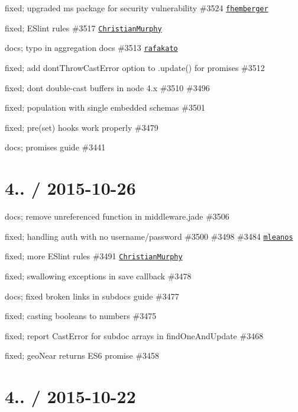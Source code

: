 \begin{DoxyItemize}
\item fixed; upgraded {\ttfamily ms} package for security vulnerability \#3524 \href{https://github.com/fhemberger}{\tt fhemberger}
\item fixed; E\+Slint rules \#3517 \href{https://github.com/ChristianMurphy}{\tt Christian\+Murphy}
\item docs; typo in aggregation docs \#3513 \href{https://github.com/rafakato}{\tt rafakato}
\item fixed; add {\ttfamily dont\+Throw\+Cast\+Error} option to .update() for promises \#3512
\item fixed; don\textquotesingle{}t double-\/cast buffers in node 4.\+x \#3510 \#3496
\item fixed; population with single embedded schemas \#3501
\item fixed; pre(\textquotesingle{}set\textquotesingle{}) hooks work properly \#3479
\item docs; promises guide \#3441
\end{DoxyItemize}

\section*{4.. / 2015-\/10-\/26 }


\begin{DoxyItemize}
\item docs; remove unreferenced function in middleware.\+jade \#3506
\item fixed; handling auth with no username/password \#3500 \#3498 \#3484 \href{https://github.com/mleanos}{\tt mleanos}
\item fixed; more E\+Slint rules \#3491 \href{https://github.com/ChristianMurphy}{\tt Christian\+Murphy}
\item fixed; swallowing exceptions in save callback \#3478
\item docs; fixed broken links in subdocs guide \#3477
\item fixed; casting booleans to numbers \#3475
\item fixed; report Cast\+Error for subdoc arrays in find\+One\+And\+Update \#3468
\item fixed; geo\+Near returns E\+S6 promise \#3458
\end{DoxyItemize}

\section*{4.. / 2015-\/10-\/22 }


